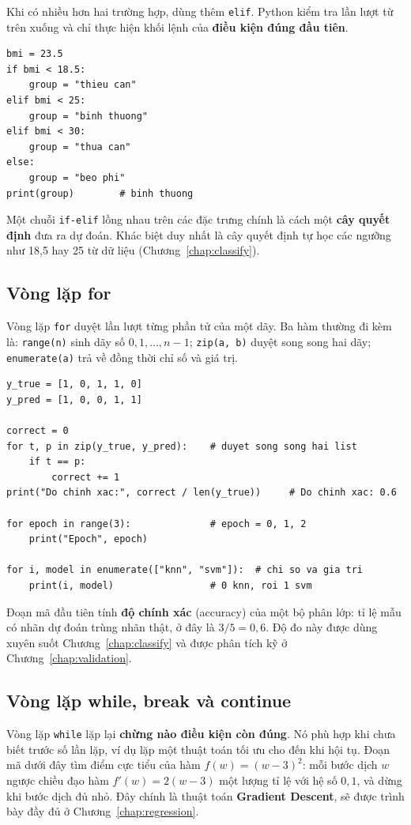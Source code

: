 Khi có nhiều hơn hai trường hợp, dùng thêm \texttt{elif}. Python kiểm tra lần lượt từ trên xuống và chỉ thực hiện khối lệnh của \textbf{điều kiện đúng đầu tiên}.

\begin{lstlisting}[caption={Nhiều nhánh với if-elif-else}]
bmi = 23.5
if bmi < 18.5:
    group = "thieu can"
elif bmi < 25:
    group = "binh thuong"
elif bmi < 30:
    group = "thua can"
else:
    group = "beo phi"
print(group)        # binh thuong
\end{lstlisting}

Một chuỗi \texttt{if-elif} lồng nhau trên các đặc trưng chính là cách một \textbf{cây quyết định} đưa ra dự đoán. Khác biệt duy nhất là cây quyết định tự học các ngưỡng như 18,5 hay 25 từ dữ liệu (Chương~\ref{chap:classify}).

\subsection{Vòng lặp for}
Vòng lặp \texttt{for} duyệt lần lượt từng phần tử của một dãy. Ba hàm thường đi kèm là: \texttt{range(n)} sinh dãy số $0, 1, \dots, n-1$; \texttt{zip(a, b)} duyệt song song hai dãy; \texttt{enumerate(a)} trả về đồng thời chỉ số và giá trị.

\begin{lstlisting}[caption={Vòng lặp for với zip, range và enumerate}]
y_true = [1, 0, 1, 1, 0]
y_pred = [1, 0, 0, 1, 1]

correct = 0
for t, p in zip(y_true, y_pred):    # duyet song song hai list
    if t == p:
        correct += 1
print("Do chinh xac:", correct / len(y_true))     # Do chinh xac: 0.6

for epoch in range(3):              # epoch = 0, 1, 2
    print("Epoch", epoch)

for i, model in enumerate(["knn", "svm"]):  # chi so va gia tri
    print(i, model)                 # 0 knn, roi 1 svm
\end{lstlisting}

\noindent Đoạn mã đầu tiên tính \textbf{độ chính xác} (accuracy) của một bộ phân lớp: tỉ lệ mẫu có nhãn dự đoán trùng nhãn thật, ở đây là $3/5 = 0{,}6$. Độ đo này được dùng xuyên suốt Chương~\ref{chap:classify} và được phân tích kỹ ở Chương~\ref{chap:validation}.

\subsection{Vòng lặp while, break và continue}
Vòng lặp \texttt{while} lặp lại \textbf{chừng nào điều kiện còn đúng}. Nó phù hợp khi chưa biết trước số lần lặp, ví dụ lặp một thuật toán tối ưu cho đến khi hội tụ. Đoạn mã dưới đây tìm điểm cực tiểu của hàm $f(w) = (w - 3)^2$: mỗi bước dịch $w$ ngược chiều đạo hàm $f'(w) = 2(w - 3)$ một lượng tỉ lệ với hệ số $0{,}1$, và dừng khi bước dịch đủ nhỏ. Đây chính là thuật toán \textbf{Gradient Descent}, sẽ được trình bày đầy đủ ở Chương~\ref{chap:regression}.

